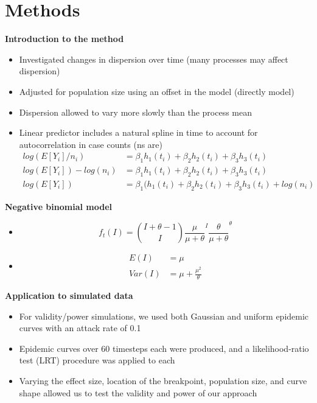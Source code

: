 \documentclass{beamer}
\begin{document}
\section{Methods}
\begin{frame}{\textbf{Introduction to the method}}
	\begin{itemize}[<+-| alert@+>] 
		\item Investigated changes in dispersion over time (many processes may affect dispersion)
		\item Adjusted for population size using an offset in the model (directly model)
		\item Dispersion allowed to vary more slowly than the process mean
		\item Linear predictor includes a natural spline in time to account for autocorrelation in case counts (ns are)
		\begin{align}
			log(E[Y_i]/n_i) &= \beta_1h_1(t_i) + \beta_2h_2(t_i) + \beta_3h_3(t_i) \\
			log(E[Y_i])-log(n_i) &= \beta_1h_1(t_i) + \beta_2h_2(t_i) + \beta_3h_3(t_i) \\ 
			log(E[Y_i]) &= \beta_1(h_1(t_i) + \beta_2h_2(t_i) + \beta_3h_3(t_i) + log(n_i) 
		\end{align}
	\end{itemize}
\end{frame}

\begin{frame}{\textbf{Negative binomial model}}
	\begin{itemize}[<+-| alert@+>] 
		\item \begin{equation}
			f_t(I) = \binom{I + \theta - 1}{I} \frac{\mu}{\mu+\theta}^I \frac{\theta}{\mu +\theta}^\theta
		\end{equation}
		\item \begin{align}
		E(I) &= \mu\\
		Var(I) &= \mu + \frac{\mu^2}{\theta}
	\end{align}
	\end{itemize}
\end{frame}

\begin{frame}{\textbf{Application to simulated data}}
\begin{itemize}[<+-| alert@+>]
	\item For validity/power simulations, we used both Gaussian and uniform epidemic curves with an attack rate of 0.1 
	\item Epidemic curves over 60 timesteps each were produced, and a likelihood-ratio test (LRT) procedure was applied to each
	\item Varying the effect size, location of the breakpoint, population size, and curve shape allowed us to test the validity and power of our approach
\end{itemize}
\end{frame}
\end{document}
